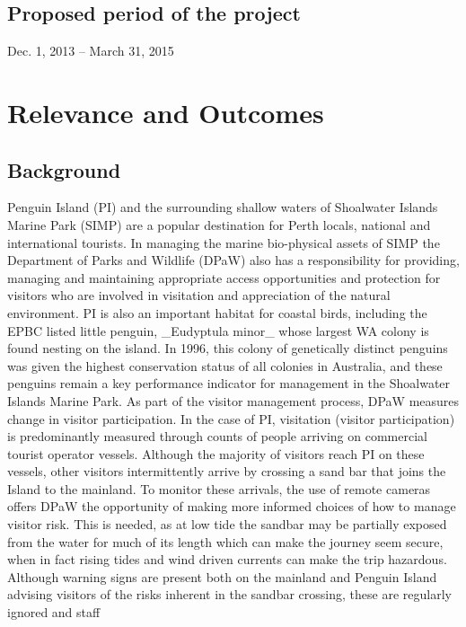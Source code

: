 \documentclass[version=last,
    paper=a4,                               %
    10pt,                                   %
    dvipsnames,
    oneside,                              %
    headings=openany,                       %
    open=any,
    BCOR=7mm,                               %
    DIV=15,     %
]{scrbook}
\begin{document}
\subsection*{Proposed period of the project}
Dec. 1, 2013 -- March 31, 2015



\section*{Relevance and Outcomes}


\subsection*{Background}

Penguin Island (PI) and the surrounding shallow waters of Shoalwater
Islands Marine Park (SIMP) are a popular destination for Perth locals,
national and international tourists. In managing the marine bio-physical
assets of SIMP the Department of Parks and Wildlife (DPaW) also has a
responsibility for providing, managing and maintaining appropriate
access opportunities and protection for visitors who are involved in
visitation and appreciation of the natural environment. PI is also an
important habitat for coastal birds, including the EPBC listed little
penguin, \_Eudyptula minor\_ whose largest WA colony is found nesting on
the island. In 1996, this colony of genetically distinct penguins was
given the highest conservation status of all colonies in Australia, and
these penguins remain a key performance indicator for management in the
Shoalwater Islands Marine Park. As part of the visitor management
process, DPaW measures change in visitor participation. In the case of
PI, visitation (visitor participation) is predominantly measured through
counts of people arriving on commercial tourist operator vessels.
Although the majority of visitors reach PI on these vessels, other
visitors intermittently arrive by crossing a sand bar that joins the
Island to the mainland. To monitor these arrivals, the use of remote
cameras offers DPaW the opportunity of making more informed choices of
how to manage visitor risk. This is needed, as at low tide the sandbar
may be partially exposed from the water for much of its length which can
make the journey seem secure, when in fact rising tides and wind driven
currents can make the trip hazardous. Although warning signs are present
both on the mainland and Penguin Island advising visitors of the risks
inherent in the sandbar crossing, these are regularly ignored and staff
\end{document}
